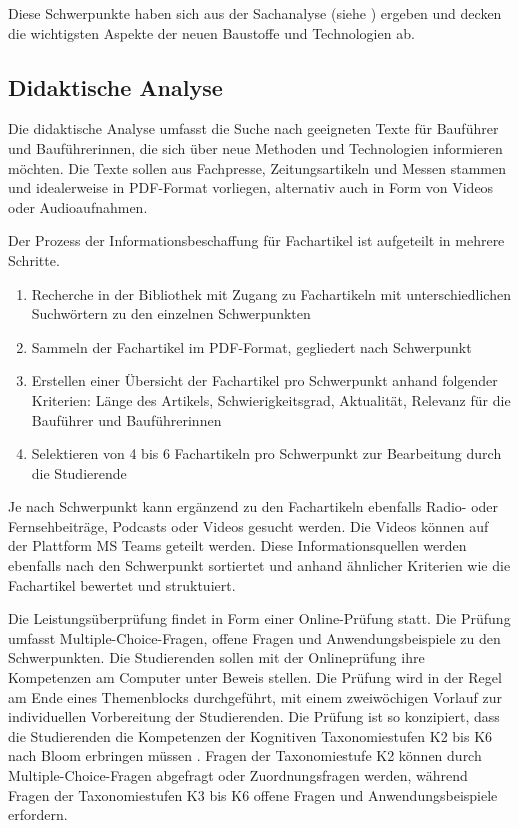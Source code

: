\documentclass[
11pt,
captions=tableheading,
smallheadings,
headsepline,
footsepline, 
captions=tableheading,
parskip=half-,
]{scrartcl}
\begin{document}
Diese Schwerpunkte haben sich aus der Sachanalyse (siehe ) ergeben und decken die wichtigsten Aspekte der neuen Baustoffe und Technologien ab.



\subsection{Didaktische Analyse}
Die didaktische Analyse umfasst die Suche nach geeigneten Texte für Bauführer und Bauführerinnen, die sich über neue Methoden und Technologien informieren möchten.
Die Texte sollen aus Fachpresse, Zeitungsartikeln und Messen stammen und idealerweise in PDF-Format vorliegen, alternativ auch in Form von Videos oder Audioaufnahmen.

Der Prozess der Informationsbeschaffung für Fachartikel ist aufgeteilt in mehrere Schritte.





\begin{enumerate}
    \item Recherche in der Bibliothek mit Zugang zu Fachartikeln mit unterschiedlichen Suchwörtern zu den einzelnen Schwerpunkten
    \item Sammeln der Fachartikel im PDF-Format, gegliedert nach Schwerpunkt
    \item Erstellen einer Übersicht der Fachartikel pro Schwerpunkt anhand folgender Kriterien: Länge des Artikels, Schwierigkeitsgrad, Aktualität, Relevanz für die Bauführer und Bauführerinnen
    \item Selektieren von 4 bis 6 Fachartikeln pro Schwerpunkt zur Bearbeitung durch die Studierende 
\end{enumerate}

Je nach Schwerpunkt kann ergänzend zu den Fachartikeln ebenfalls Radio- oder Fernsehbeiträge, Podcasts oder Videos gesucht werden. 
Die Videos können auf der Plattform MS Teams geteilt werden.
Diese Informationsquellen werden ebenfalls nach den Schwerpunkt sortiertet und anhand ähnlicher Kriterien wie die Fachartikel bewertet und struktuiert.

Die Leistungsüberprüfung findet in Form einer Online-Prüfung statt.
Die Prüfung umfasst Multiple-Choice-Fragen, offene Fragen und Anwendungsbeispiele zu den Schwerpunkten.
Die Studierenden sollen mit der Onlineprüfung ihre Kompetenzen am Computer unter Beweis stellen.  
Die Prüfung wird in der Regel am Ende eines Themenblocks durchgeführt, mit einem zweiwöchigen Vorlauf zur individuellen Vorbereitung der Studierenden.
Die Prüfung ist so konzipiert, dass die Studierenden die Kompetenzen der Kognitiven Taxonomiestufen K2 bis K6 nach Bloom erbringen müssen \cite{bloom1956taxonomy}.
Fragen der Taxonomiestufe K2 können durch Multiple-Choice-Fragen abgefragt oder Zuordnungsfragen werden, während Fragen der Taxonomiestufen K3 bis K6 offene Fragen und Anwendungsbeispiele erfordern.
\end{document}
